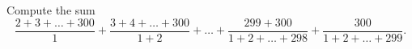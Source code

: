 Compute the sum \[\dfrac{2+3+\ldots+300}{1}+\dfrac{3+4+\ldots+300}{1+2}+\ldots+\dfrac{299+300}{1+2+\ldots+298}+\dfrac{300}{1+2+\ldots+299}.\]
